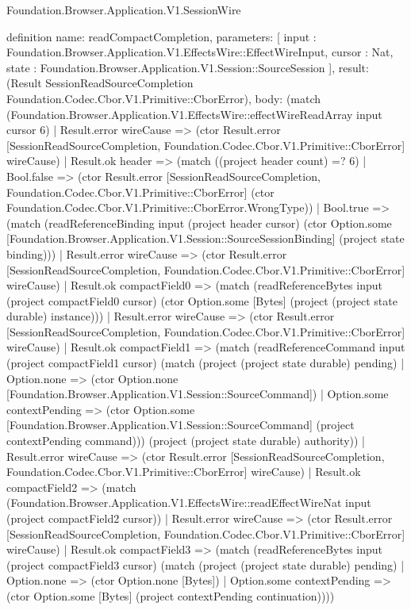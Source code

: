 \begin{lexlean}{Foundation.Browser.Application.V1.SessionWire}
\begin{semanticmodule}
definition{
  name: readCompactCompletion,
  parameters: [
    input : Foundation.Browser.Application.V1.EffectsWire::EffectWireInput,
    cursor : Nat,
    state : Foundation.Browser.Application.V1.Session::SourceSession
  ],
  result: (Result SessionReadSourceCompletion Foundation.Codec.Cbor.V1.Primitive::CborError),
  body: (match (Foundation.Browser.Application.V1.EffectsWire::effectWireReadArray input cursor 6)
    | Result.error wireCause => (ctor Result.error [SessionReadSourceCompletion, Foundation.Codec.Cbor.V1.Primitive::CborError] wireCause)
    | Result.ok header => (match ((project header count) =? 6)
      | Bool.false => (ctor Result.error [SessionReadSourceCompletion, Foundation.Codec.Cbor.V1.Primitive::CborError] (ctor Foundation.Codec.Cbor.V1.Primitive::CborError.WrongType))
      | Bool.true => (match (readReferenceBinding input (project header cursor) (ctor Option.some [Foundation.Browser.Application.V1.Session::SourceSessionBinding] (project state binding)))
        | Result.error wireCause => (ctor Result.error [SessionReadSourceCompletion, Foundation.Codec.Cbor.V1.Primitive::CborError] wireCause)
        | Result.ok compactField0 => (match (readReferenceBytes input (project compactField0 cursor) (ctor Option.some [Bytes] (project (project state durable) instance)))
          | Result.error wireCause => (ctor Result.error [SessionReadSourceCompletion, Foundation.Codec.Cbor.V1.Primitive::CborError] wireCause)
          | Result.ok compactField1 => (match (readReferenceCommand input (project compactField1 cursor) (match (project (project state durable) pending)
              | Option.none => (ctor Option.none [Foundation.Browser.Application.V1.Session::SourceCommand])
              | Option.some contextPending => (ctor Option.some [Foundation.Browser.Application.V1.Session::SourceCommand] (project contextPending command))) (project (project state durable) authority))
            | Result.error wireCause => (ctor Result.error [SessionReadSourceCompletion, Foundation.Codec.Cbor.V1.Primitive::CborError] wireCause)
            | Result.ok compactField2 => (match (Foundation.Browser.Application.V1.EffectsWire::readEffectWireNat input (project compactField2 cursor))
              | Result.error wireCause => (ctor Result.error [SessionReadSourceCompletion, Foundation.Codec.Cbor.V1.Primitive::CborError] wireCause)
              | Result.ok compactField3 => (match (readReferenceBytes input (project compactField3 cursor) (match (project (project state durable) pending)
                  | Option.none => (ctor Option.none [Bytes])
                  | Option.some contextPending => (ctor Option.some [Bytes] (project contextPending continuation))))
}
\end{semanticmodule}
\end{lexlean}

